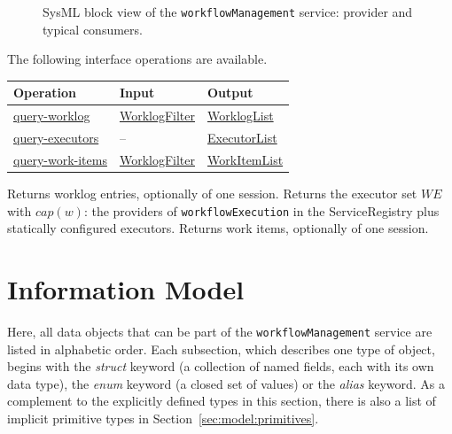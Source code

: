\documentclass[a4paper]{arrowhead}
\newcommand{\mref}[1]{{\textcolor{ArrowheadPurple}{\hyperref[sec:model:#1]{#1}}}}
\newcommand{\oref}[1]{{\textcolor{ArrowheadBlue}{\hyperref[sec:operations:#1]{#1}}}}
\begin{document}
\begin{figure}[ht!]
  \centering
  \caption{SysML block view of the \texttt{workflowManagement} service: provider and typical consumers.}
  \label{fig:SD}
\end{figure}

The following interface operations are available.

{\small
\begin{longtable}{|p{4.4cm}|p{5.6cm}|p{5.8cm}|}

\hline
\rowcolor{gray!33} Operation & Input & Output \\ \hline
\endhead
\oref{query-worklog} & \mref{WorklogFilter} & \mref{WorklogList} \\ \hline
\oref{query-executors} & -- & \mref{ExecutorList} \\ \hline
\oref{query-work-items} & \mref{WorklogFilter} & \mref{WorkItemList} \\ \hline
\end{longtable}
}

Returns worklog entries, optionally of one session.
Returns the executor set $WE$ with $cap(w)$: the providers of \texttt{workflowExecution} in the ServiceRegistry plus statically configured executors.
Returns work items, optionally of one session.

\newpage
\section{Information Model}
\label{sec:model}
Here, all data objects that can be part of the \texttt{workflowManagement} service are listed in alphabetic order. Each
subsection, which describes one type of object, begins with the \textit{struct} keyword (a collection of named fields,
each with its own data type), the \textit{enum} keyword (a closed set of values) or the \textit{alias} keyword. As a
complement to the explicitly defined types in this section, there is also a list of implicit primitive types in
Section~\ref{sec:model:primitives}.
\end{document}
